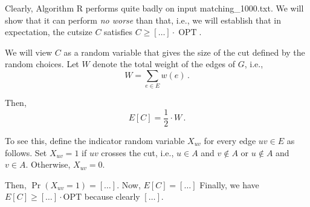 \documentclass{tufte-handout}
\begin{document}
Clearly, Algorithm R performs quite badly on input 
  matching\_1000.txt.
We will show that it can perform \emph{no worse} than that, i.e., we
will establish that in expectation, the cutsize $C$ satisfies $C \geq
[\ldots]\cdot \operatorname{OPT}$.\


We will view $C$ as a random variable that gives the size of the cut
defined by the random choices.
Let $W$ denote the total weight of the edges of $G$, i.e.,
\[ W= \sum_{e\in E} w(e)\,.\]

Then,
\begin{equation}\label{eq: E[C]}
E[C] = \textstyle\frac{1}{2}\cdot W\,.
\end{equation}

To see this, define the indicator random variable $X_{uv}$ for every
edge $uv\in E$ as follows.
Set $X_{uv}=1$ if $uv$ crosses the cut, i.e., $u\in A$ and $v\notin A$
or $u\notin A$ and $v\in A$.
Otherwise, $X_{uv} = 0$.

Then, $\Pr(X_{uv} = 1) = [\ldots]$.
Now, $E[C]=[\ldots]$ Finally, we have 
\(E[C]\geq [\ldots]\cdot \text{OPT}\) because clearly
$[\ldots]$.
\end{document}
